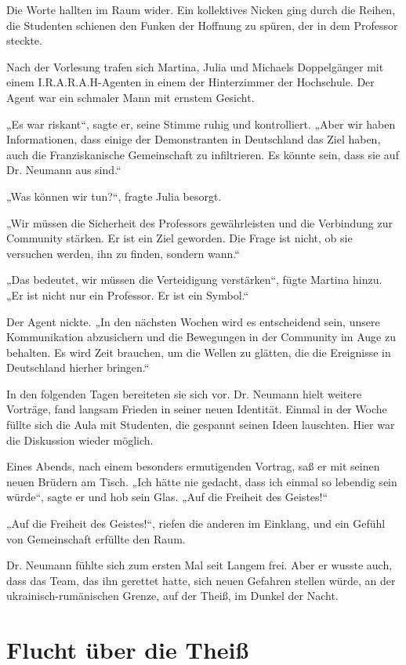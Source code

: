 \documentclass[
]{article}
\begin{document}
Die Worte hallten im Raum wider. Ein kollektives Nicken ging durch die Reihen, die Studenten schienen den Funken der Hoffnung zu spüren, der in dem Professor steckte.

Nach der Vorlesung trafen sich Martina, Julia und Michaels Doppelgänger mit einem I.R.A.R.A.H-Agenten in einem der Hinterzimmer der Hochschule. Der Agent war ein schmaler Mann mit ernstem Gesicht.

„Es war riskant``, sagte er, seine Stimme ruhig und kontrolliert. „Aber wir haben Informationen, dass einige der Demonstranten in Deutschland das Ziel haben, auch die Franziskanische Gemeinschaft zu infiltrieren. Es könnte sein, dass sie auf Dr. Neumann aus sind.``

„Was können wir tun?{\kern0pt}``, fragte Julia besorgt.

„Wir müssen die Sicherheit des Professors gewährleisten und die Verbindung zur Community stärken. Er ist ein Ziel geworden. Die Frage ist nicht, ob sie versuchen werden, ihn zu finden, sondern wann.``

„Das bedeutet, wir müssen die Verteidigung verstärken``, fügte Martina hinzu. „Er ist nicht nur ein Professor. Er ist ein Symbol.``

Der Agent nickte. „In den nächsten Wochen wird es entscheidend sein, unsere Kommunikation abzusichern und die Bewegungen in der Community im Auge zu behalten. Es wird Zeit brauchen, um die Wellen zu glätten, die die Ereignisse in Deutschland hierher bringen.``

In den folgenden Tagen bereiteten sie sich vor. Dr. Neumann hielt weitere Vorträge, fand langsam Frieden in seiner neuen Identität. Einmal in der Woche füllte sich die Aula mit Studenten, die gespannt seinen Ideen lauschten. Hier war die Diskussion wieder möglich.

Eines Abends, nach einem besonders ermutigenden Vortrag, saß er mit seinen neuen Brüdern am Tisch. „Ich hätte nie gedacht, dass ich einmal so lebendig sein würde``, sagte er und hob sein Glas. „Auf die Freiheit des Geistes!{\kern0pt}``

„Auf die Freiheit des Geistes!{\kern0pt}``, riefen die anderen im Einklang, und ein Gefühl von Gemeinschaft erfüllte den Raum.

Dr. Neumann fühlte sich zum ersten Mal seit Langem frei. Aber er wusste auch, dass das Team, das ihn gerettet hatte, sich neuen Gefahren stellen würde, an der ukrainisch-rumänischen Grenze, auf der Theiß, im Dunkel der Nacht.

\section{Flucht über die Theiß}\label{flucht-uxfcber-die-theiuxdf}
\end{document}
